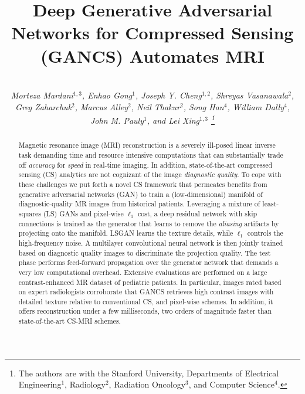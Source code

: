 \documentclass{journal}
\title{Deep Generative Adversarial Networks for Compressed Sensing (GANCS) Automates MRI}
\author{\\{\it \large{Morteza Mardani$^{1,3}$, Enhao Gong$^{1}$, Joseph Y. Cheng$^{1,2}$, Shreyas Vasanawala$^{2}$,}} \\ \it{ \large{Greg Zaharchuk$^{2}$, Marcus  Alley$^{2}$, Neil Thakur$^{2}$, Song Han$^{4}$, William Dally$^{4}$,}} \\ {\it \large{John M. Pauly$^{1}$, and Lei Xing$^{1,3}$}} \thanks{The authors are with the Stanford University, Departments of Electrical Engineering$^{1}$, Radiology$^{2}$, Radiation Oncology$^{3}$, and Computer Science$^{4}$. } \\ }
\begin{document}

\maketitle 

\begin{abstract}
Magnetic resonance image (MRI) reconstruction is a severely ill-posed linear inverse task demanding time and resource intensive computations that can substantially trade off {\it accuracy} for {\it speed} in real-time imaging. In addition, state-of-the-art compressed sensing (CS) analytics are not cognizant of the image {\it diagnostic quality}. To cope with these challenges we put forth a novel CS framework that permeates benefits from generative adversarial networks (GAN) to train a (low-dimensional) manifold of diagnostic-quality MR images from historical patients. Leveraging a mixture of least-squares (LS) GANs and pixel-wise $\ell_1$ cost, a deep residual network with skip connections is trained as the generator that learns to remove the {\it aliasing} artifacts by projecting onto the manifold. LSGAN learns the texture details, while $\ell_1$ controls the high-frequency noise. A multilayer convolutional neural network is then jointly trained based on diagnostic quality images to discriminate the projection quality. The test phase performs feed-forward propagation over the generator network that demands a very low computational overhead. Extensive evaluations are performed on a large contrast-enhanced MR dataset of pediatric patients. In particular, images rated based on expert radiologists corroborate that GANCS retrieves high contrast images with detailed texture relative to conventional CS, and pixel-wise schemes. In addition, it offers reconstruction under a few milliseconds, two orders of magnitude faster than state-of-the-art CS-MRI schemes. 
\end{abstract}
\end{document}
